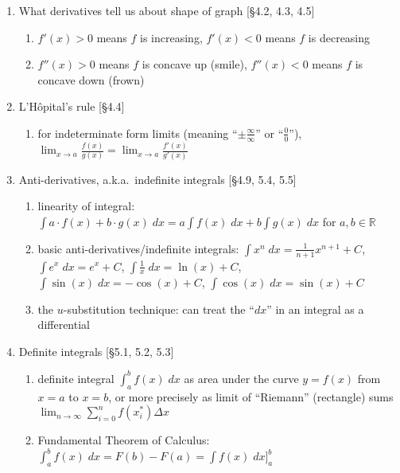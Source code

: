 \documentclass[11pt]{article}
\begin{document}
\begin{enumerate}
\item What derivatives tell us about shape of graph [\S 4.2, 4.3, 4.5]
\begin{enumerate}
\item $f'(x)>0$ means $f$ is increasing, $f'(x) <0$ means $f$ is decreasing
\item $f''(x)>0$ means $f$ is concave up (smile), $f''(x) <0$ means $f$ is concave down (frown)
\end{enumerate}

\item L'H\^{o}pital's rule [\S 4.4]
\begin{enumerate}
\item for indeterminate form limits (meaning ``$\pm \frac{\infty}{\infty}$'' or ``$\frac{0}{0}$''), $\lim_{x\to a} \frac{f(x)}{g(x)} = \lim_{x\to a} \frac{f'(x)}{g'(x)}$
\end{enumerate}

\item Anti-derivatives, a.k.a.~indefinite integrals [\S 4.9, 5.4, 5.5]
\begin{enumerate}
\item linearity of integral: $\int a\cdot f(x) + b\cdot g(x) \; dx = a\int f(x) \; dx + b \int g(x) \; dx$ for $a,b\in \mathbb{R}$
\item basic anti-derivatives/indefinite integrals: $\int x^n \; dx = \frac{1}{n+1}x^{n+1}+C$, $\int e^x \; dx = e^x + C$, $\int \frac{1}{x} \; dx = \ln(x) + C$, $\int \sin(x) \; dx = -\cos(x) +C$, $\int \cos(x) \; dx = \sin(x) + C$
\item the $u$-substitution technique: can treat the ``$dx$'' in an integral as a differential
\end{enumerate}

\item Definite integrals [\S 5.1, 5.2, 5.3]
\begin{enumerate}
\item definite integral $\int_{a}^{b} f(x) \; dx$ as area under the curve $y=f(x)$ from $x=a$ to $x=b$, or more precisely as limit of ``Riemann'' (rectangle) sums $\lim_{n \to \infty} \sum_{i=0}^{n} f(x^{*}_i) \Delta x$
\item Fundamental Theorem of Calculus: $\int_{a}^{b} f(x) \; dx = F(b)-F(a) =\int f(x) \; dx \big ]_{a}^{b}$ 
\end{enumerate}

\end{enumerate}
\end{document}
